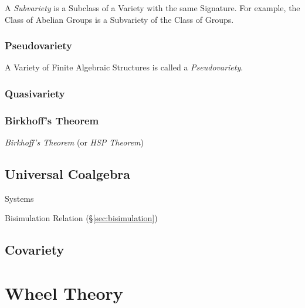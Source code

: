 A \emph{Subvariety} is a Subclass of a Variety with the same
Signature. For example, the Class of Abelian Groups is a Subvariety of
the Class of Groups.



\subsubsection{Pseudovariety}\label{sec:pseudovariety}

A Variety of Finite Algebraic Structures is called a
\emph{Pseudovariety}.



\subsubsection{Quasivariety}\label{sec:quasivariety}



\subsubsection{Birkhoff's Theorem}\label{sec:birkhoffs_theorem}
\cite{birkhoff35}

\emph{Birkhoff's Theorem} (or \emph{HSP Theorem})



\subsection{Universal Coalgebra}\label{sec:universal_coalgebra}

\cite{rutten00}

Systems

Bisimulation Relation (\S\ref{sec:bisimulation})



\subsection{Covariety}\label{sec:covariety}

\section{Wheel Theory}\label{sec:wheel_theory}

